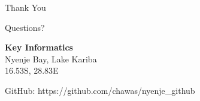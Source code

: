 \documentclass[10pt]{beamer}
\begin{document}
\begin{frame}
\begin{center}
\Huge \textcolor{primary}{Thank You}

\vspace{0.5cm}
\Large Questions?

\vspace{1cm}
\normalsize
\textbf{Key Informatics}\\
Nyenje Bay, Lake Kariba\\
16.53S, 28.83E

\vspace{0.5cm}
\small
GitHub: https://github.com/chawas/nyenje_github
\end{center}
\end{frame}
\end{document}
